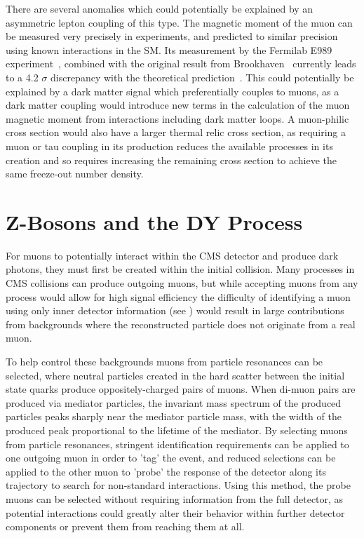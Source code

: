 There are several anomalies which could potentially be explained by an asymmetric lepton coupling of this type.
The magnetic moment of the muon can be measured very precisely in experiments, and predicted to similar precision using known interactions in the SM.
Its measurement by the Fermilab E989 experiment~\cite{gminus2}, combined with the original result from Brookhaven~\cite{gminus2_bnl} currently leads to a 4.2 $\sigma$ discrepancy with the theoretical prediction~\cite{gminus2_theory}. 
This could potentially be explained by a dark matter signal which preferentially couples to muons, as a dark matter coupling would introduce new terms in the calculation of the muon magnetic moment from interactions including dark matter loops.
A muon-philic cross section would also have a larger thermal relic cross section, as requiring a muon or tau coupling in its production reduces the available processes in its creation and so requires increasing the remaining cross section to achieve the same freeze-out number density.

\section{Z-Bosons and the DY Process}
For muons to potentially interact within the CMS detector and produce dark photons, they must first be created within the initial collision.
Many processes in CMS collisions can produce outgoing muons, but while accepting muons from any process would allow for high signal efficiency the difficulty of identifying a muon using only inner detector information (see ) would result in large contributions from backgrounds where the reconstructed particle does not originate from a real muon.

To help control these backgrounds muons from particle resonances can be selected, where neutral particles created in the hard scatter between the initial state quarks produce oppositely-charged pairs of muons.
When di-muon pairs are produced via mediator particles, the invariant mass spectrum of the produced particles peaks sharply near the mediator particle mass, with the width of the produced peak proportional to the lifetime of the mediator. 
By selecting muons from particle resonances, stringent identification requirements can be applied to one outgoing muon in order to 'tag' the event, and reduced selections can be applied to the other muon to 'probe' the response of the detector along its trajectory to search for non-standard interactions. 
Using this method, the probe muons can be selected without requiring information from the full detector, as potential \dbrem interactions could greatly alter their behavior within further detector components or prevent them from reaching them at all.

